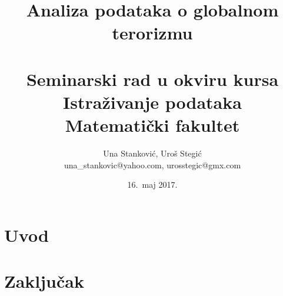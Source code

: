 \documentclass[a4paper]{article}
\begin{document}
\title{Analiza podataka o globalnom terorizmu \\ \small{~\\Seminarski rad u okviru kursa\\Istraživanje podataka\\ Matematički fakultet}}

\author{
	Una Stanković, Uroš Stegić\\
	una\_stankovic@yahoo.com, urosstegic@gmx.com}
\date{16.~maj 2017.}
\maketitle

	

\tableofcontents

\newpage


\section{Uvod}
\label{sec:uvod}
\section{Zaključak}
\label{sec:zakljucak}


\appendix
 

\end{document}
